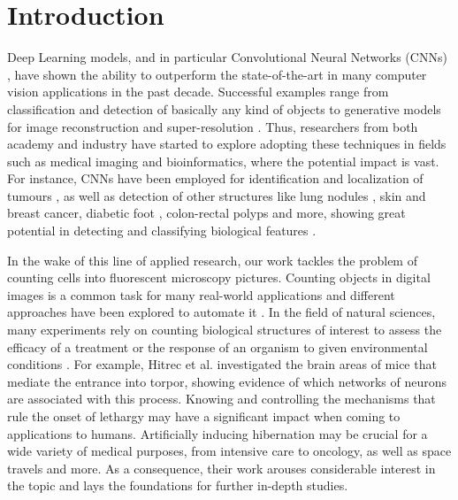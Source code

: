 \chapter{Introduction}
\label{chap:partI_intro}

Deep Learning models, and in particular Convolutional Neural Networks (CNNs) \cite{jimenez, greenspan}, have shown the ability to outperform the state-of-the-art in many computer vision applications in the past decade. Successful examples range from classification and detection of basically any kind of objects \cite{AlexNet, YOLO} to generative models for image reconstruction \cite{reconstruction} and super-resolution \cite{super-resolution}.
Thus, researchers from both academy and industry have started to explore adopting these techniques in fields such as medical imaging and bioinformatics, where the potential impact is vast.
For instance, CNNs have been employed for identification and localization of tumours \cite{brain_tumor,breast_cancer, ciresan2012deep, cirecsan2013mitosis}, as well as detection of other structures like lung nodules \cite{lung_nodules, meraj2020lung, su2021lung}, skin and breast cancer, diabetic foot \cite{TL_medical_imaging}, colon-rectal polyps \cite{korbar} and more, showing great potential in detecting and classifying biological features \cite{lundervold, sahiner, yadav}.

In the wake of this line of applied research, our work tackles the problem of counting cells into fluorescent microscopy pictures.
Counting objects in digital images is a common task for many real-world applications \cite{segui2015learning, arteta2016counting, paul2017count, rahnemoonfar2017deepfruit} and different approaches have been explored to automate it \cite{lempitsky2010learning, ciresan2012deep, cirecsan2013mitosis, Kraus2016, Raza2017}. 
In the field of natural sciences, many experiments rely on counting biological structures of interest to assess the efficacy of a treatment or the response of an organism to given environmental conditions \cite{hitrec2019neural, hitrec2021reversible, da2020median}.
For example, Hitrec et al. \cite{hitrec2019neural} investigated the brain areas of mice that mediate the entrance into torpor, showing evidence of which networks of neurons are associated with this process.
Knowing and controlling the mechanisms that rule the onset of lethargy may have a significant impact when coming to applications to humans.
Artificially inducing hibernation may be crucial for a wide variety of medical purposes, from intensive care to oncology, as well as space travels and more.
As a consequence,  their work arouses considerable interest in the topic and lays the foundations for further in-depth studies.


